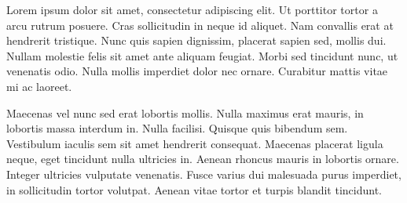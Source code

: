 
Lorem ipsum dolor sit amet, consectetur adipiscing elit. Ut porttitor tortor a arcu rutrum posuere. Cras sollicitudin in neque id aliquet. Nam convallis erat at hendrerit tristique. Nunc quis sapien dignissim, placerat sapien sed, mollis dui. Nullam molestie felis sit amet ante aliquam feugiat. Morbi sed tincidunt nunc, ut venenatis odio. Nulla mollis imperdiet dolor nec ornare. Curabitur mattis vitae mi ac laoreet.

Maecenas vel nunc sed erat lobortis mollis. Nulla maximus erat mauris, in lobortis massa interdum in. Nulla facilisi. Quisque quis bibendum sem. Vestibulum iaculis sem sit amet hendrerit consequat. Maecenas placerat ligula neque, eget tincidunt nulla ultricies in. Aenean rhoncus mauris in lobortis ornare. Integer ultricies vulputate venenatis. Fusce varius dui malesuada purus imperdiet, in sollicitudin tortor volutpat. Aenean vitae tortor et turpis blandit tincidunt.

